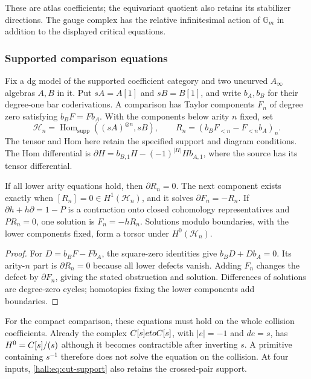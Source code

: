 These are atlas coefficients; the equivariant quotient also
retains its stabilizer directions. The gauge complex has the
relative infinitesimal action of $\mathbb G_m$ in addition to
the displayed critical
equations.

\subsubsection*{Supported comparison equations}

Fix a dg model of the supported coefficient category and two
uncurved $A_\infty$ algebras $A,B$ in it. Put $sA=A[1]$ and
$sB=B[1]$, and write $b_A,b_B$ for their degree-one bar
coderivations. A comparison has Taylor components $F_n$ of
degree zero satisfying $b_BF=Fb_A$. With the components below
arity $n$ fixed, set
\[
 \mathcal H_n=\operatorname{Hom}_{\mathrm{supp}}
             ((sA)^{\otimes n},sB),\qquad
 R_n=(b_BF_{<n}-F_{<n}b_A)_n.
\]
The tensor and Hom here retain the specified support and diagram
conditions. The Hom differential is
$\partial H=b_{B,1}H-(-1)^{|H|}Hb_{A,1}$, where the source
has its tensor differential.

\begin{proposition}
\label{hall:prop:supported-residual}
If all lower arity equations hold, then $\partial R_n=0$.
The next component exists exactly when
$[R_n]=0\in H^1(\mathcal H_n)$, and it solves
$\partial F_n=-R_n$. If
$\partial h+h\partial=1-P$ is a contraction onto closed
cohomology representatives and $PR_n=0$, one solution is
$F_n=-hR_n$. Solutions modulo boundaries, with the lower
components fixed, form a torsor under $H^0(\mathcal H_n)$.
\end{proposition}

\begin{proof}
For $D=b_BF-Fb_A$, the square-zero identities give
$b_BD+Db_A=0$. Its arity-$n$ part is $\partial R_n=0$
because all lower defects vanish. Adding $F_n$ changes the
defect by $\partial F_n$, giving the stated obstruction and
solution. Differences of solutions are degree-zero cycles;
homotopies fixing the lower components add boundaries.
\end{proof}

For the compact comparison, these equations must hold on the
whole collision coefficients. Already the complex
$C[s]etoC[s]$, with $|e|=-1$ and $de=s$, has
$H^0=C[s]/(s)$ although it becomes contractible after
inverting $s$. A primitive containing $s^{-1}$ therefore does
not solve the equation on the collision. At four inputs,
\eqref{hall:eq:cut-support} also retains the crossed-pair support.

